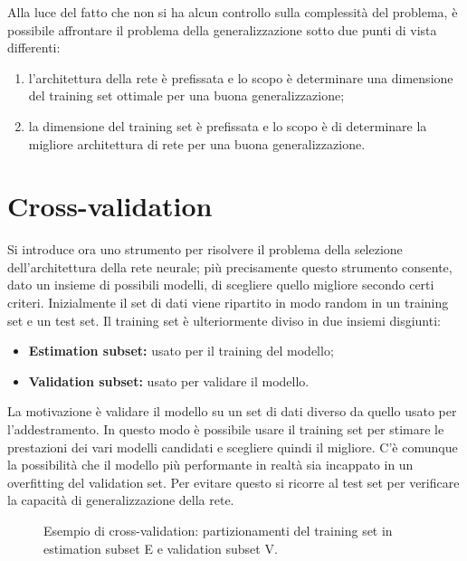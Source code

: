 \newpage

Alla luce del fatto che non si ha alcun controllo sulla complessità del problema, è possibile affrontare il problema della generalizzazione sotto due punti di vista differenti:
\begin{enumerate}
    \item l'architettura della rete è prefissata e lo scopo è determinare una dimensione del training set ottimale per una buona generalizzazione;
    \item la dimensione del training set è prefissata e lo scopo è di determinare la migliore architettura di rete per una buona generalizzazione.
\end{enumerate}



\section{Cross-validation} %
\label{sec:cross_validation}
Si introduce ora uno strumento per risolvere il problema della selezione dell’architettura della rete neurale; più precisamente questo strumento consente, dato un insieme di possibili modelli, di scegliere quello migliore secondo certi criteri.
Inizialmente il set di dati viene ripartito in modo random in un training set e un test set. Il training set è ulteriormente diviso in due insiemi disgiunti:
\begin{itemize}
    \item \textbf{Estimation subset:} usato per il training del modello;
    \item \textbf{Validation subset:} usato per validare il modello.
\end{itemize}
La motivazione è validare il modello su un set di dati diverso da quello usato per l'addestramento. In questo modo è possibile usare il training set per stimare le prestazioni dei vari modelli candidati e scegliere quindi il migliore. C'è comunque la possibilità che il modello più performante in realtà sia incappato in un overfitting del validation set. Per evitare questo si ricorre al test set per verificare la capacità di generalizzazione della rete.

\newpage

\begin{figure}[h!]
    \centering
\caption{Esempio di cross-validation: partizionamenti del training set in estimation subset E e validation subset V.}
\end{figure}

